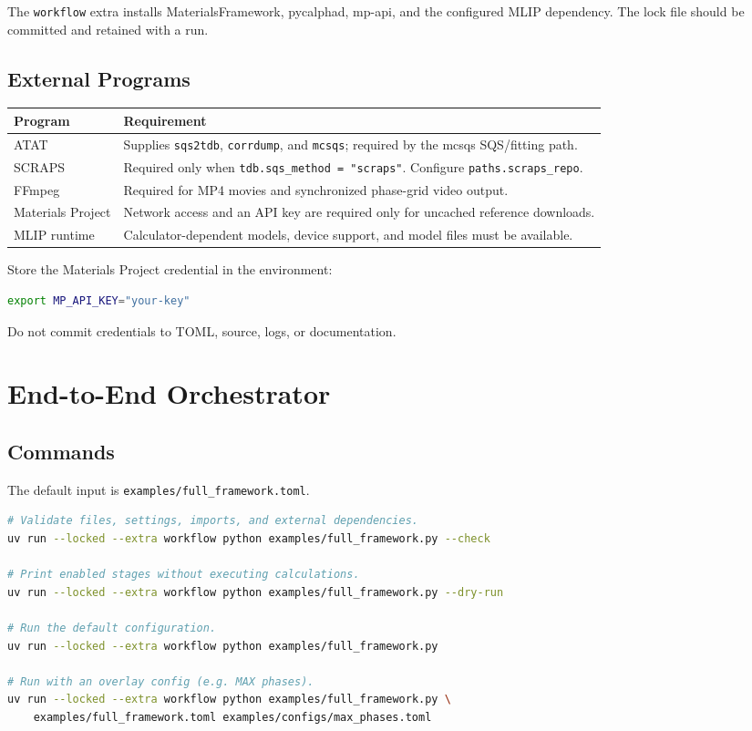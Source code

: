 \documentclass[11pt,letterpaper]{article}
\newcommand{\file}[1]{\nolinkurl{#1}}
\newcommand{\setting}[1]{\nolinkurl{#1}}
\begin{document}
The \setting{workflow} extra installs MaterialsFramework, pycalphad, mp-api,
and the configured MLIP dependency. The lock file should be committed and
retained with a run.

\subsection{External Programs}

\begin{longtable}{p{}p{}}
\toprule
Program & Requirement \\
\midrule
\endhead
ATAT & Supplies \file{sqs2tdb}, \file{corrdump}, and \file{mcsqs}; required by the mcsqs SQS/fitting path. \\
SCRAPS & Required only when \setting{tdb.sqs_method = "scraps"}. Configure \setting{paths.scraps_repo}. \\
FFmpeg & Required for MP4 movies and synchronized phase-grid video output. \\
Materials Project & Network access and an API key are required only for uncached reference downloads. \\
MLIP runtime & Calculator-dependent models, device support, and model files must be available. \\
\bottomrule
\end{longtable}

Store the Materials Project credential in the environment:
\begin{lstlisting}[language=bash]
export MP_API_KEY="your-key"
\end{lstlisting}
Do not commit credentials to TOML, source, logs, or documentation.

\section{End-to-End Orchestrator}

\subsection{Commands}

The default input is \file{examples/full_framework.toml}.
\begin{lstlisting}[language=bash]
# Validate files, settings, imports, and external dependencies.
uv run --locked --extra workflow python examples/full_framework.py --check

# Print enabled stages without executing calculations.
uv run --locked --extra workflow python examples/full_framework.py --dry-run

# Run the default configuration.
uv run --locked --extra workflow python examples/full_framework.py

# Run with an overlay config (e.g. MAX phases).
uv run --locked --extra workflow python examples/full_framework.py \
    examples/full_framework.toml examples/configs/max_phases.toml
\end{lstlisting}
\end{document}

